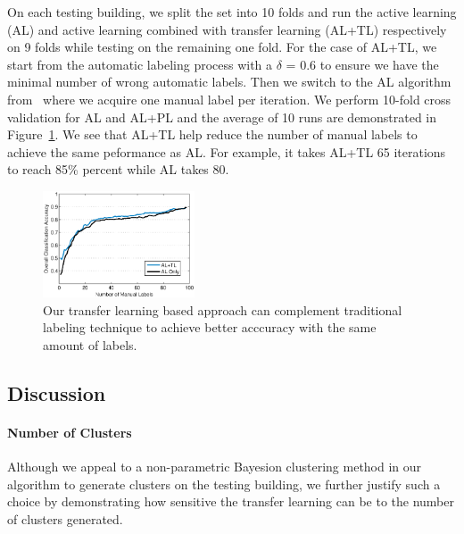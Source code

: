 On each testing building, we split the set into 10 folds and run the active learning (AL) and active learning combined with transfer learning (AL+TL) respectively on 9 folds while testing on the remaining one fold.
For the case of AL+TL, we start from the automatic labeling process with a $\delta$ = 0.6 to ensure we have the minimal number of wrong automatic labels. Then we switch to the AL algorithm from~\cite{cikm} where we acquire one manual label per iteration.
We perform 10-fold cross validation for AL and AL+PL and the average of 10 runs are demonstrated in Figure~\ref{fig:comp}. We see that AL+TL help reduce the number of manual labels to achieve the same peformance as AL.
For example, it takes AL+TL 65 iterations to reach 85\% percent while AL takes 80.


\begin{figure}[t]
\centering
\includegraphics[width=0.4\textwidth]{./fig/tl_al.eps}
\caption{Our transfer learning based approach can complement traditional labeling technique to achieve better acccuracy with the same amount of labels.}
\label{fig:comp}
\end{figure}


\subsection{Discussion}
\paragraph{Number of Clusters}
Although we appeal to a non-parametric Bayesion clustering method in our algorithm to generate clusters on the testing building, we further justify such a choice by demonstrating how sensitive the transfer learning can be to the number of clusters generated.

